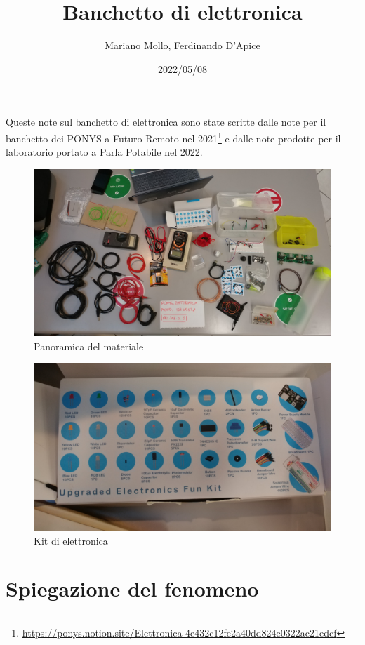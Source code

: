 \documentclass[a4paper]{article}
\title{Banchetto di elettronica}
\author{Mariano Mollo, Ferdinando D'Apice}
\date{2022/05/08}
\begin{document}
\maketitle{}

Queste note sul banchetto di elettronica sono state scritte dalle note per il
banchetto dei PONYS a Futuro Remoto nel 2021\footnote{
  \url{https://ponys.notion.site/Elettronica-4e432c12fe2a40dd824e0322ac21edcf} }
e dalle note prodotte per il laboratorio portato a Parla Potabile nel 2022.

\begin{figure}[ht]
  \centering
  \includegraphics[angle=90, width=\linewidth]{figures/panoramica_materiale}
  \caption{\label{fig:panoramica} Panoramica del materiale}
\end{figure}

\begin{figure}[ht]
  \centering
  \includegraphics[width=\linewidth]{figures/kit_elettronica}
  \caption{\label{fig:kit} Kit di elettronica}
\end{figure}

\section{Spiegazione del fenomeno}%
\label{sec:fenomeno}
\end{document}
